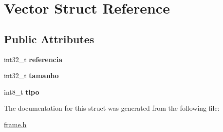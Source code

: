 \hypertarget{structVector}{}\section{Vector Struct Reference}
\label{structVector}
\subsection*{Public Attributes}
\begin{DoxyCompactItemize}
\item 
\mbox{\label{structVector_a0f2af0912b4d39a569c01fc73c409b0f}} 
int32\+\_\+t {\bfseries referencia}
\item 
\mbox{\label{structVector_a7444f49069adbd72108bda57a0585476}} 
int32\+\_\+t {\bfseries tamanho}
\item 
\mbox{\label{structVector_a7dfc8127c1b5681c6b4ccd3c036710e7}} 
int8\+\_\+t {\bfseries tipo}
\end{DoxyCompactItemize}


The documentation for this struct was generated from the following file\+:\begin{DoxyCompactItemize}
\item 
\mbox{\hyperlink{frame_8h}{frame.\+h}}\end{DoxyCompactItemize}
